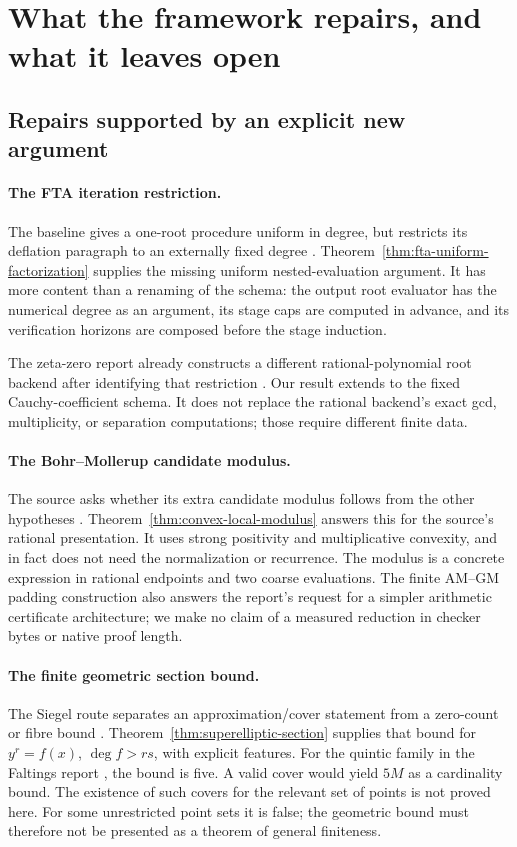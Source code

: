 \section{What the framework repairs, and what it leaves open}
\label{sec:audit}

\subsection{Repairs supported by an explicit new argument}

\paragraph{The FTA iteration restriction.}
The baseline gives a one-root procedure uniform in degree, but restricts
its deflation paragraph to an externally fixed degree
\cite{repo-fta}. Theorem~\ref{thm:fta-uniform-factorization} supplies the
missing uniform nested-evaluation argument. It has more content than a
renaming of the schema: the output root evaluator has the numerical
degree as an argument, its stage caps are computed in advance, and its
verification horizons are composed before the stage induction.

The zeta-zero report already constructs a different rational-polynomial
root backend after identifying that restriction \cite{repo-zeta-roots}.
Our result extends to the fixed Cauchy-coefficient schema. It does not
replace the rational backend's exact gcd, multiplicity, or separation
computations; those require different finite data.

\paragraph{The Bohr--Mollerup candidate modulus.}
The source asks whether its extra candidate modulus follows from the
other hypotheses \cite{repo-bm}. Theorem~\ref{thm:convex-local-modulus}
answers this for the source's rational presentation. It uses strong
positivity and multiplicative convexity, and in fact does not need the
normalization or recurrence. The modulus is a concrete expression in
rational endpoints and two coarse evaluations. The finite AM--GM padding
construction also answers the report's request for a simpler arithmetic
certificate architecture; we make no claim of a measured reduction in
checker bytes or native proof length.

\paragraph{The finite geometric section bound.}
The Siegel route separates an approximation/cover statement from a
zero-count or fibre bound \cite{repo-siegel}. Theorem~\ref{thm:superelliptic-section}
supplies that bound for $y^r=f(x)$, $\deg f>rs$, with explicit features.
For the quintic family in the Faltings report \cite{repo-faltings}, the
bound is five. A valid cover would yield $5M$ as a cardinality bound.
The existence of such covers for the relevant set of points is not
proved here. For some unrestricted point sets it is false; the geometric
bound must therefore not be presented as a theorem of general finiteness.

